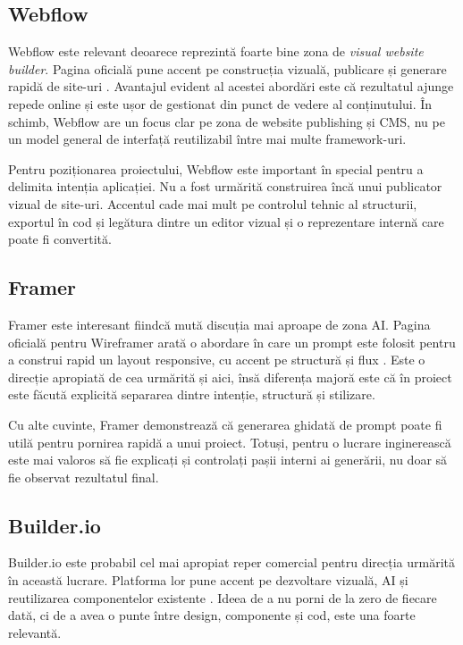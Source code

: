\subsection{Webflow}

Webflow este relevant deoarece reprezintă foarte bine zona de \textit{visual website builder}. Pagina oficială pune accent pe construcția vizuală, publicare și generare rapidă de site-uri \cite{webflow2026}. Avantajul evident al acestei abordări este că rezultatul ajunge repede online și este ușor de gestionat din punct de vedere al conținutului. În schimb, Webflow are un focus clar pe zona de website publishing și CMS, nu pe un model general de interfață reutilizabil între mai multe framework-uri.

Pentru poziționarea proiectului, Webflow este important în special pentru a delimita intenția aplicației. Nu a fost urmărită construirea încă unui publicator vizual de site-uri. Accentul cade mai mult pe controlul tehnic al structurii, exportul în cod și legătura dintre un editor vizual și o reprezentare internă care poate fi convertită.

\subsection{Framer}

Framer este interesant fiindcă mută discuția mai aproape de zona AI. Pagina oficială pentru Wireframer arată o abordare în care un prompt este folosit pentru a construi rapid un layout responsive, cu accent pe structură și flux \cite{framerWireframer2026}. Este o direcție apropiată de cea urmărită și aici, însă diferența majoră este că în proiect este făcută explicită separarea dintre intenție, structură și stilizare.

Cu alte cuvinte, Framer demonstrează că generarea ghidată de prompt poate fi utilă pentru pornirea rapidă a unui proiect. Totuși, pentru o lucrare inginerească este mai valoros să fie explicați și controlați pașii interni ai generării, nu doar să fie observat rezultatul final.

\subsection{Builder.io}

Builder.io este probabil cel mai apropiat reper comercial pentru direcția urmărită în această lucrare. Platforma lor pune accent pe dezvoltare vizuală, AI și reutilizarea componentelor existente \cite{builderPlatform2026,builderAi2026}. Ideea de a nu porni de la zero de fiecare dată, ci de a avea o punte între design, componente și cod, este una foarte relevantă.

